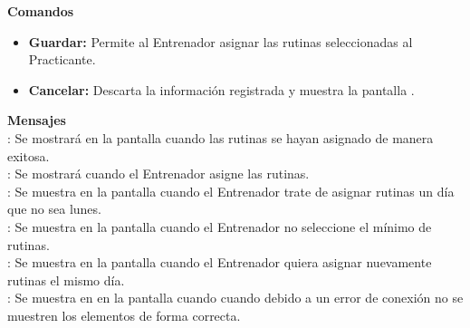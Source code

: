 \clearpage

\textbf{\textcolor[rgb]{0, 0, 0.545098}{Comandos}}	
\begin{itemize}
	\item \textbf{\textcolor[rgb]{0, 0, 0.545098}{Guardar:}} Permite al Entrenador asignar las rutinas seleccionadas al Practicante.
	\item \textbf{\textcolor[rgb]{0, 0, 0.545098}{Cancelar:}} Descarta la información registrada y muestra la pantalla .
\end{itemize}
\vspace{1em}

\textbf{\textcolor[rgb]{0, 0, 0.545098}{Mensajes}}\\

\textbf{}: Se mostrará en la pantalla  cuando las rutinas se hayan asignado de manera exitosa.\\

\textbf{}: Se mostrará cuando el Entrenador asigne las rutinas.\\

\textbf{}: Se muestra en la pantalla  cuando el Entrenador trate de asignar rutinas un día que no sea lunes.\\

\textbf{}: Se muestra en la pantalla  cuando el Entrenador no seleccione el mínimo de rutinas.\\

\textbf{}: Se muestra en la pantalla  cuando el Entrenador quiera asignar nuevamente rutinas el mismo día.\\

\textbf{}: Se muestra en en la pantalla  cuando cuando debido a un error de conexión no se muestren los elementos de forma correcta.\\

\clearpage